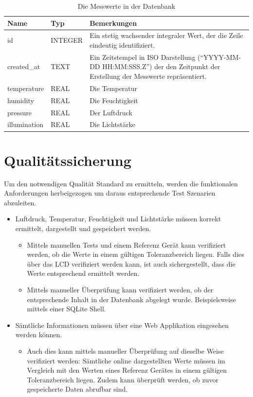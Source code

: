 \documentclass[
    10pt,
    a4paper,
]{scrartcl}
\begin{document}
\begin{table}
    \centering
    \begin{tabularx}{\columnwidth}{|l|l|X|} \hline
        \textbf{Name} & \textbf{Typ} & \textbf{Bemerkungen} \\\hline
        id & INTEGER & Ein stetig wachsender integraler Wert, der die Zeile eindeutig
            identifiziert. \\\hline
        created\_at & TEXT & Ein Zeitstempel in ISO Darstellung ("`YYYY-MM-DD
            HH:MM:SSS.Z"') der den Zeitpunkt der Erstellung der Messwerte repräsentiert.
            \\\hline
        temperature & REAL & Die Temperatur \\\hline
        humidity & REAL &  Die Feuchtigkeit \\\hline
        pressure & REAL & Der Luftdruck \\\hline
        illumination & REAL & Die Lichtstärke \\\hline
    \end{tabularx}
    \caption{Die Messwerte in der Datenbank}
    \label{tab:db-table}
\end{table}

\section{Qualitätssicherung}
Um den notwendigen Qualität Standard zu ermitteln, werden die funktionalen Anforderungen
herbeigezogen um daraus entsprechende Test Szenarien abzuleiten.

\begin{itemize}
    \item Luftdruck, Temperatur, Feuchtigkeit und Lichtstärke müssen korrekt ermittelt,
        dargestellt und gespeichert werden.
        \begin{itemize}
            \item Mittels manuellen Tests und einem Referenz Gerät kann verifiziert
                werden, ob die Werte in einem gültigen Toleranzbereich liegen. Falls dies
                über das LCD verifiziert werden kann, ist auch sichergestellt, dass die
                Werte entsprechend ermittelt werden.
            \item Mittels manueller Überprüfung kann verifiziert werden, ob der
                entsprechende Inhalt in der Datenbank abgelegt wurde. Beispielsweise
                mittels einer SQLite Shell.
        \end{itemize}
    \item Sämtliche Informationen müssen über eine Web Applikation eingesehen werden
        können.
        \begin{itemize}
            \item Auch dies kann mittels manueller Überprüfung auf dieselbe Weise
                verifiziert werden: Sämtliche online dargestellten Werte müssen im
                Vergleich mit den Werten eines Referenz Gerätes in einem gültigen
                Toleranzbereich liegen. Zudem kann überprüft werden, ob zuvor gespeicherte
                Daten abrufbar sind.
        \end{itemize}
\end{itemize}
\end{document}
